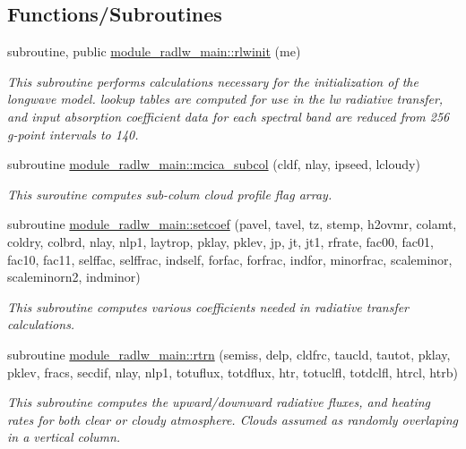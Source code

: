 \subsection*{Functions/\+Subroutines}
\begin{DoxyCompactItemize}
\item 
subroutine, public \hyperlink{group__module__radlw__main_gaa9569479682c83b26584b7e9ee6841fa}{module\+\_\+radlw\+\_\+main\+::rlwinit} (me)
\begin{DoxyCompactList}\small\item\em This subroutine performs calculations necessary for the initialization of the longwave model. lookup tables are computed for use in the lw radiative transfer, and input absorption coefficient data for each spectral band are reduced from 256 g-\/point intervals to 140. \end{DoxyCompactList}\item 
subroutine \hyperlink{group__module__radlw__main_ga9318778651bca6ec1f1776da6c21dfda}{module\+\_\+radlw\+\_\+main\+::mcica\+\_\+subcol} (cldf, nlay, ipseed, lcloudy)
\begin{DoxyCompactList}\small\item\em This suroutine computes sub-\/colum cloud profile flag array. \end{DoxyCompactList}\item 
subroutine \hyperlink{group__module__radlw__main_gaeb7b74288cf87988c14bf6e24a2039ae}{module\+\_\+radlw\+\_\+main\+::setcoef} (pavel, tavel, tz, stemp, h2ovmr, colamt, coldry, colbrd, nlay, nlp1, laytrop, pklay, pklev, jp, jt, jt1, rfrate, fac00, fac01, fac10, fac11, selffac, selffrac, indself, forfac, forfrac, indfor, minorfrac, scaleminor, scaleminorn2, indminor)
\begin{DoxyCompactList}\small\item\em This subroutine computes various coefficients needed in radiative transfer calculations. \end{DoxyCompactList}\item 
subroutine \hyperlink{group__module__radlw__main_gab002119955eb2b82f16352459180f5ed}{module\+\_\+radlw\+\_\+main\+::rtrn} (semiss, delp, cldfrc, taucld, tautot, pklay, pklev, fracs, secdif, nlay, nlp1, totuflux, totdflux, htr, totuclfl, totdclfl, htrcl, htrb)
\begin{DoxyCompactList}\small\item\em This subroutine computes the upward/downward radiative fluxes, and heating rates for both clear or cloudy atmosphere. Clouds assumed as randomly overlaping in a vertical column. \end{DoxyCompactList}\item 

\end{DoxyCompactItemize}
